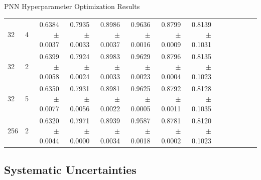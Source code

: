 \documentclass[aspectratio=169,xcolor=table]{beamer}
\begin{document}
\begin{frame}{PNN Hyperparameter Optimization Results}
\begin{table}
\begin{center}
{\begin{tabular}{llrrrrrrrrrrrr}
        32 &  4 & 0.6384  $\pm$ 0.0037  & 0.7935  $\pm$ 0.0033  & 0.8986  $\pm$ 0.0037  & 0.9636  $\pm$ 0.0016  & 0.8799  $\pm$ 0.0009  & 0.8139  $\pm$ 0.1031  \\
        32 &  2 & 0.6399  $\pm$ 0.0058  & 0.7924  $\pm$ 0.0024  & 0.8983  $\pm$ 0.0033  & 0.9629  $\pm$ 0.0023  & 0.8796  $\pm$ 0.0004  & 0.8135  $\pm$ 0.1023  \\
        32 &  5 & 0.6350  $\pm$ 0.0077  & 0.7931  $\pm$ 0.0056  & 0.8981  $\pm$ 0.0022  & 0.9625  $\pm$ 0.0005  & 0.8792  $\pm$ 0.0011  & 0.8128  $\pm$ 0.1035  \\
        256 & 2 & 0.6320  $\pm$ 0.0044  & 0.7971  $\pm$ 0.0000  & 0.8939  $\pm$ 0.0034  & 0.9587  $\pm$ 0.0018  & 0.8781  $\pm$ 0.0002  & 0.8120  $\pm$ 0.1023  \\
      \bottomrule
      \end{tabular}}
        \end{center}
    \end{table}
  \end{frame}


 \subsection{Systematic Uncertainties }
\end{document}
